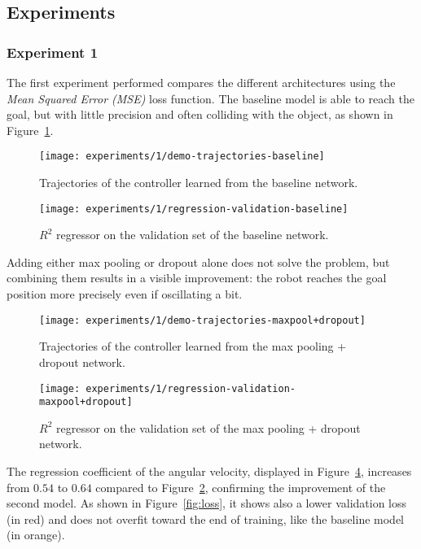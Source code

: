 \subsection{Experiments}
\subsubsection{Experiment 1}
The first experiment performed compares the different architectures using the 
\emph{Mean Squared Error (MSE)} loss function.
The baseline model is able to reach the goal, but with little precision and 
often colliding with the object, as shown in Figure~\ref{fig:baseline}.

\begin{figure}[htbp]
	\centerline{\texttt{[image: experiments/1/demo-trajectories-baseline]}}
	\caption{Trajectories of the controller learned from the baseline network.}
	\label{fig:baseline}
\end{figure}

\begin{figure}[htbp]
	\centerline{\texttt{[image: experiments/1/regression-validation-baseline]}}
	\caption{$R^2$ regressor on the validation set of the baseline network.}
	\label{fig:regression-baseline}
\end{figure}

Adding either max pooling or dropout alone does not solve the problem, but 
combining them results in a visible improvement: the robot reaches the goal 
position more precisely even if oscillating a bit.

\begin{figure}[htbp]
	\centerline{\texttt{[image: experiments/1/demo-trajectories-maxpool+dropout]}}
	\caption{Trajectories of the controller learned from the max pooling + 
	dropout network.}
	\label{fig:maxpool+dropout}
\end{figure}

\begin{figure}[htbp]
	\centerline{\texttt{[image: experiments/1/regression-validation-maxpool+dropout]}}
	\caption{$R^2$ regressor on the validation set of the max pooling + dropout 
	network.}
	\label{fig:regression-maxpool+dropout}
\end{figure}

The regression coefficient of the angular velocity, displayed in 
Figure~\ref{fig:regression-maxpool+dropout}, increases from $0.54$ to $0.64$ 
compared to Figure~\ref{fig:regression-baseline}, confirming the improvement of 
the second model. As shown in Figure~\ref{fig:loss}, it shows also a lower 
validation loss (in red) and does not overfit toward the end of training, like 
the baseline model (in orange).


